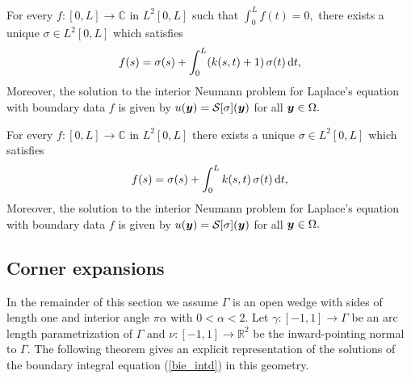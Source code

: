 \begin{theorem}
For every  $f:[0,L] \rightarrow \mathbb{C}$ in $L^{2}[0,L]$ such that $\int_{0}^{L} f(t) = 0,$ there exists a unique $\sigma \in L^{2}[0,L]$ which satisfies
\begin{align}
f(s)=  \sigma(s)+ \int_0^L (k(s,t) + 1)\,\sigma(t)\,{\rm d}t,
\label{bie_intn}
\end{align}
Moreover, the solution to the interior Neumann problem for Laplace's equation with boundary data $f$ is given by $u(\boldsymbol{y}) = \mathcal{S}[\sigma](\boldsymbol{y})$ for all $\boldsymbol{y} \in \Omega.$
\end{theorem}


\begin{theorem}
For every $f:[0,L] \rightarrow \mathbb{C}$ in $L^{2}[0,L]$ there exists a unique $\sigma \in L^{2}[0,L]$ which satisfies
\begin{align}
f(s)=  \sigma(s)+ \int_0^L k(s,t) \,\sigma(t)\,{\rm d}t,
\label{bie_extn}
\end{align}
Moreover, the solution to the interior Neumann problem for Laplace's equation with boundary data $f$ is given by $u(\boldsymbol{y}) = \mathcal{S}[\sigma](\boldsymbol{y})$ for all $\boldsymbol{y} \in \Omega.$
\end{theorem}

\subsection{Corner expansions}

In the remainder of this section we assume $\Gamma$ is an open wedge with sides of length one and interior angle $\pi \alpha$ with $0 <\alpha<2.$ Let $\gamma:[-1,1] \rightarrow \Gamma$ be an arc length parametrization of $\Gamma$ and $\nu:[-1,1] \rightarrow \mathbb{R}^2$ be the inward-pointing normal to $\Gamma.$ 
The following theorem  gives an explicit representation of the solutions of the boundary integral equation (\ref{bie_intd}) in this geometry.

